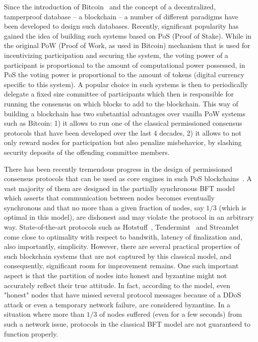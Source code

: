 \documentclass[12pt, fleqn]{article}
\begin{document}
Since the introduction of Bitcoin~\cite{nakamoto2008bitcoin} and the concept of a decentralized, tamperproof database -- a blockchain -- a number of different paradigms have been developed to design such databases.
%
Recently, significant popularity has gained the idea of building such systems based on PoS (Proof of Stake).
%
While in the original PoW (Proof of Work, as used in Bitcoin) mechanism that is used for incentivizing participation and securing the system, the voting power of a participant is proportional to the amount of computational power possessed, in PoS the voting power is proportional to the amount of tokens (digital currency specific to this system).
%
A popular choice in such systems is then to periodically delegate a fixed size committee of participants which then is responsible for running the consensus on which blocks to add to the blockchain.
%
This way of building a blockchain has two substantial advantages over vanilla PoW systems such as Bitcoin: 1) it allows to run one of the classical permissioned consensus protocols that have been developed over the last 4 decades, 2) it allows to not only reward nodes for participation but also penalize misbehavior, by slashing security deposits of the offending committee members.
%

There has been recently tremendous progress in the design of permissioned consensus protocols that can be used as core engines in such PoS blockchains~\cite{BG17,YMRGA19,AMNRY19,BKM18,CS20,BKM18,GAGMPRSTT19,zamfir2018casper,GLSS19}.
%
A vast majority of them are designed in the partially synchronous BFT model~\cite{DLS88} which asserts that communication between nodes becomes eventually synchronous and that no more than a given fraction of nodes, say $1/3$ (which is optimal in this model), are dishonest and may violate the protocol in an arbitrary way.
%
State-of-the-art protocols such as Hotstuff~\cite{YMRGA19}, Tendermint~\cite{BG17} and Streamlet~\cite{CS20} come close to optimality with respect to bandwith, latency of finalization and, also importantly, simplicity.
%
However, there are several practical properties of such blockchain systems that are not captured by this classical model, and consequently, significant room for improvement remains.
%
One such important aspect is that the partition of nodes into honest and byzantine might not accurately reflect their true attitude.
%
In fact, according to the model, even "honest" nodes that have missed several protocol messages because of a DDoS attack or even a temporary network failure, are considered byzantine.
%
In a situation where more than $1/3$ of nodes suffered (even for a few seconds) from such a network issue, protocols in the classical BFT model are not guaranteed to function properly.
\end{document}
